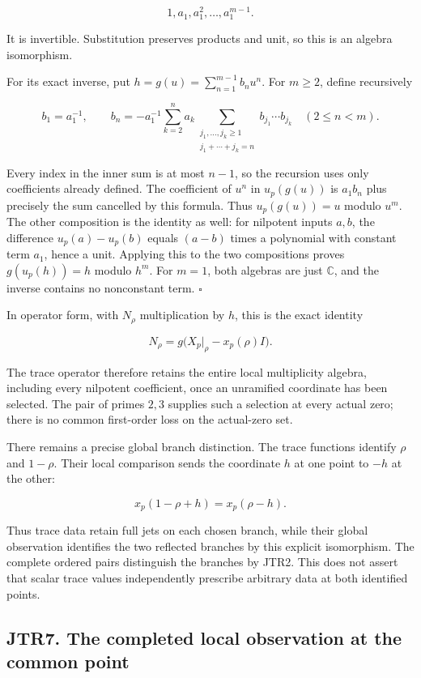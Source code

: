 \documentclass[
]{article}
\begin{document}
\[
1,a_1,a_1^2,\ldots,a_1^{m-1}.
\]

It is invertible. Substitution preserves products and unit, so this is
an algebra isomorphism.

For its exact inverse, put \(h=g(u)=\sum_{n=1}^{m-1}b_nu^n\). For
\(m\ge2\), define recursively

\[
b_1=a_1^{-1},
\qquad
b_n=-a_1^{-1}
\sum_{k=2}^n a_k
\sum_{\substack{j_1,\ldots,j_k\ge1\\j_1+\cdots+j_k=n}}
b_{j_1}\cdots b_{j_k}
\quad(2\le n<m).
\tag{JTR6.4}
\]

Every index in the inner sum is at most \(n-1\), so the recursion uses
only coefficients already defined. The coefficient of \(u^n\) in
\(u_p(g(u))\) is \(a_1b_n\) plus precisely the sum cancelled by this
formula. Thus \(u_p(g(u))=u\) modulo \(u^m\). The other composition is
the identity as well: for nilpotent inputs \(a,b\), the difference
\(u_p(a)-u_p(b)\) equals \((a-b)\) times a polynomial with constant term
\(a_1\), hence a unit. Applying this to the two compositions proves
\(g(u_p(h))=h\) modulo \(h^m\). For \(m=1\), both algebras are just
\(\mathbb C\), and the inverse contains no nonconstant term. \(\square\)

In operator form, with \(N_\rho\) multiplication by \(h\), this is the
exact identity

\[
\boxed{N_\rho=g\bigl(X_p|_\rho-x_p(\rho)I\bigr).}
\tag{JTR6.5}
\]

The trace operator therefore retains the entire local multiplicity
algebra, including every nilpotent coefficient, once an unramified
coordinate has been selected. The pair of primes \(2,3\) supplies such a
selection at every actual zero; there is no common first-order loss on
the actual-zero set.

There remains a precise global branch distinction. The trace functions
identify \(\rho\) and \(1-\rho\). Their local comparison sends the
coordinate \(h\) at one point to \(-h\) at the other:

\[
x_p(1-\rho+h)=x_p(\rho-h).
\tag{JTR6.6}
\]

Thus trace data retain full jets on each chosen branch, while their
global observation identifies the two reflected branches by this
explicit isomorphism. The complete ordered pairs distinguish the
branches by JTR2. This does not assert that scalar trace values
independently prescribe arbitrary data at both identified points.

\subsection{JTR7. The completed local observation at the common
point}\label{jtr7.-the-completed-local-observation-at-the-common-point}
\end{document}
